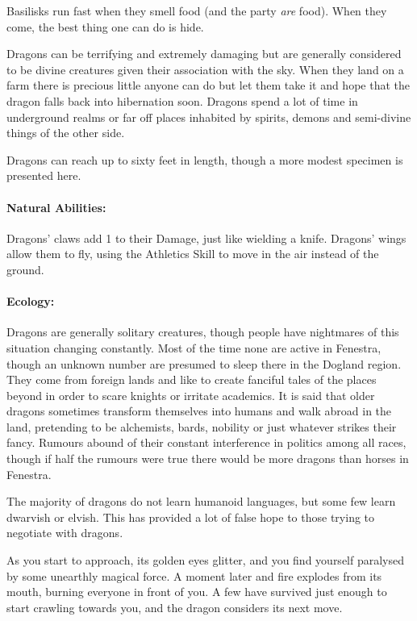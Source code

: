 \begin{multicols}{2}
Basilisks run fast when they smell food (and the party \emph{are} food).
When they come, the best thing one can do is hide.

\label{dragon}

Dragons can be terrifying and extremely damaging but are generally considered to be divine creatures given their association with the sky.
When they land on a farm there is precious little anyone can do but let them take it and hope that the dragon falls back into hibernation soon.
Dragons spend a lot of time in underground realms or far off places inhabited by spirits, demons and semi-divine things of the other side.

Dragons can reach up to sixty feet in length, though a more modest specimen is presented here.

\paragraph{Natural Abilities:} Dragons' claws add 1 to their Damage, just like wielding a knife.
Dragons' wings allow them to fly, using the Athletics Skill to move in the air instead of the ground.

\paragraph{Ecology:} Dragons are generally solitary creatures, though people have nightmares of this situation changing constantly.
Most of the time none are active in Fenestra, though an unknown number are presumed to sleep there in the Dogland region.
They come from foreign lands and like to create fanciful tales of the places beyond in order to scare knights or irritate academics.
It is said that older dragons sometimes transform themselves into humans and walk abroad in the land, pretending to be alchemists, bards, nobility or just whatever strikes their fancy.
Rumours abound of their constant interference in politics among all races, though if half the rumours were true there would be more dragons than horses in Fenestra.

The majority of dragons do not learn humanoid languages, but some few learn dwarvish or elvish.
This has provided a lot of false hope to those trying to negotiate with dragons.

\begin{boxtext}

	As you start to approach, its golden eyes glitter, and you find yourself paralysed by some unearthly magical force.
A moment later and fire explodes from its mouth, burning everyone in front of you.
	A few have survived just enough to start crawling towards you, and the dragon considers its next move.


\end{boxtext}
\end{multicols}
